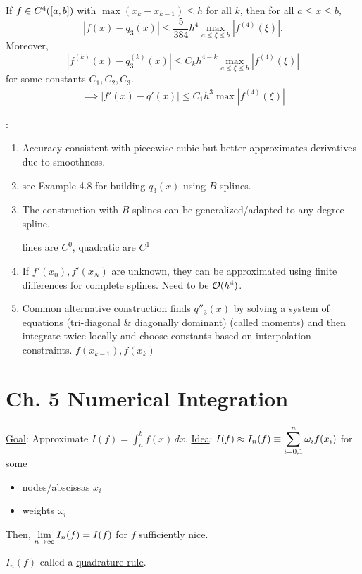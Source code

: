 \documentclass[]{article}
\begin{document}
\begin{theorem}
	[Convergence]
	If $f\in C^{4}({[}a,b{]})$ with $\max (x_k-x_{k-1})\leq h$ for all $k$, then for all $a\leq x\leq b$, $$ |f(x)-q_3(x)| \leq \frac5{384}h^4 \max_{a\leq\xi\leq b} |f^{(4)}(\xi)|. $$
	Moreover, $$|f^{(k)}(x)-q_3^{(k)}(x)| \leq C_kh^{4-k}\max_{a\leq\xi\leq b}|f^{(4)}(\xi)|$$ for some constants $C_1,C_2,C_3$.
	\begin{align*}
		\implies |f'(x)-q'(x)| \leq C_1h^3 \max |f^{(4)}(\xi)|
	\end{align*}
\end{theorem}
\begin{note}:
	\begin{enumerate}
		\item Accuracy consistent with piecewise cubic but better approximates derivatives due to smoothness. %
		\item see Example 4.8 for building $q_3(x)$ using $B$-splines.
		\item The construction with $B$-splines can be generalized/adapted to any degree spline.

			lines are $C^0$, quadratic are $C^1$
		\item If $f'(x_0),f'(x_N)$ are unknown, they can be approximated using finite differences for complete splines.
			Need to be $\mathcal{O}(h^4)$.
		\item Common alternative construction finds $q''_3(x)$ by solving a system of equations (tri-diagonal \& diagonally dominant) (called moments) and then integrate twice locally and choose constants based on interpolation constraints. $f(x_{k-1}),f(x_k)$
	\end{enumerate}
\end{note}

\section*{Ch. 5 Numerical Integration}

\ul{Goal}: Approximate $I(f)=\int_a^b f(x)\,dx$.
\ul{Idea}: $\displaystyle I(f) \approx I_n(f) \equiv \sum_{i=0,1}^n \omega_if(x_i)$ for some
\begin{itemize}
	\item nodes/abscissas $x_i$
	\item weights $\omega_i$
\end{itemize}
Then, $\displaystyle\lim_{n\rightarrow\infty} I_n(f) = I(f)$ for $f$ sufficiently nice.
\begin{definition}
	$I_n(f)$ called a \ul{quadrature rule}.
\end{definition}
\end{document}
